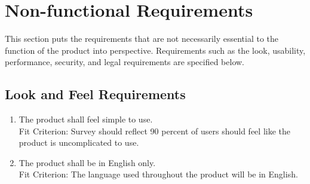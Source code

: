 \documentclass[12pt, titlepage]{article}
\begin{document}
\section{Non-functional Requirements}
This section puts the requirements that are not necessarily essential to the function of the product into perspective. Requirements such as the look, usability, performance, security, and legal requirements are specified below.

\subsection{Look and Feel Requirements}
\begin{adjustwidth}{2.2em}{0pt}
\begin{enumerate}[{NFR-L}1.]
   \item The product shall feel simple to use.\\ \label{NFR-L1}
   Fit Criterion: Survey should reflect 90 percent of users should feel like the product is uncomplicated to use.
   \item The product shall be in English only.\\\label{NFR-L2}
   Fit Criterion: The language used throughout the product will be in English.
\end{enumerate}
\end{adjustwidth}
 
\end{document}
